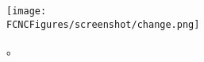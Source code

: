 \begin{figure}[H]
\centering
\texttt{[image: \\FCNCFigures/screenshot/change.png]}
\caption{。}
\label{fig:change}
\end{figure}